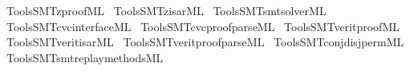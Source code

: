 \begin{isabellebody}
\isamarkupfalse%
\ {\isacartoucheopen}Tools{\isacharslash}{\kern0pt}SMT{\isacharslash}{\kern0pt}z{}{\isacharunderscore}{\kern0pt}proof{\isachardot}{\kern0pt}ML{\isacartoucheclose}\isanewline
{}\isamarkupfalse%
\ {\isacartoucheopen}Tools{\isacharslash}{\kern0pt}SMT{\isacharslash}{\kern0pt}z{}{\isacharunderscore}{\kern0pt}isar{\isachardot}{\kern0pt}ML{\isacartoucheclose}\isanewline
{}\isamarkupfalse%
\ {\isacartoucheopen}Tools{\isacharslash}{\kern0pt}SMT{\isacharslash}{\kern0pt}smt{\isacharunderscore}{\kern0pt}solver{\isachardot}{\kern0pt}ML{\isacartoucheclose}\isanewline
{}\isamarkupfalse%
\ {\isacartoucheopen}Tools{\isacharslash}{\kern0pt}SMT{\isacharslash}{\kern0pt}cvc{}{\isacharunderscore}{\kern0pt}interface{\isachardot}{\kern0pt}ML{\isacartoucheclose}\isanewline
{}\isamarkupfalse%
\ {\isacartoucheopen}Tools{\isacharslash}{\kern0pt}SMT{\isacharslash}{\kern0pt}cvc{}{\isacharunderscore}{\kern0pt}proof{\isacharunderscore}{\kern0pt}parse{\isachardot}{\kern0pt}ML{\isacartoucheclose}\isanewline
{}\isamarkupfalse%
\ {\isacartoucheopen}Tools{\isacharslash}{\kern0pt}SMT{\isacharslash}{\kern0pt}verit{\isacharunderscore}{\kern0pt}proof{\isachardot}{\kern0pt}ML{\isacartoucheclose}\isanewline
{}\isamarkupfalse%
\ {\isacartoucheopen}Tools{\isacharslash}{\kern0pt}SMT{\isacharslash}{\kern0pt}verit{\isacharunderscore}{\kern0pt}isar{\isachardot}{\kern0pt}ML{\isacartoucheclose}\isanewline
{}\isamarkupfalse%
\ {\isacartoucheopen}Tools{\isacharslash}{\kern0pt}SMT{\isacharslash}{\kern0pt}verit{\isacharunderscore}{\kern0pt}proof{\isacharunderscore}{\kern0pt}parse{\isachardot}{\kern0pt}ML{\isacartoucheclose}\isanewline
{}\isamarkupfalse%
\ {\isacartoucheopen}Tools{\isacharslash}{\kern0pt}SMT{\isacharslash}{\kern0pt}conj{\isacharunderscore}{\kern0pt}disj{\isacharunderscore}{\kern0pt}perm{\isachardot}{\kern0pt}ML{\isacartoucheclose}\isanewline
{}\isamarkupfalse%
\ {\isacartoucheopen}Tools{\isacharslash}{\kern0pt}SMT{\isacharslash}{\kern0pt}smt{\isacharunderscore}{\kern0pt}replay{\isacharunderscore}{\kern0pt}methods{\isachardot}{\kern0pt}ML{\isacartoucheclose}\isanewline

\end{isabellebody}
